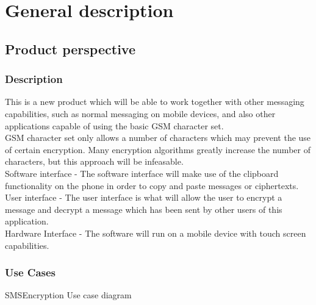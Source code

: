 \section{General description}

\subsection{Product perspective}

\subsubsection{Description}
This is a new product which will be able to work together with other messaging capabilities, such as normal messaging on mobile devices, and also other applications capable of using the basic GSM character set.
\vspace{12pt}\\
GSM character set only allows a number of characters which may prevent the use of certain encryption. Many encryption algorithms greatly increase the number of characters, but this approach will be infeasable.
\vspace{12pt}\\
Software interface - The software interface will make use of the clipboard functionality on the phone in order to copy and paste messages or ciphertexts.
\vspace{12pt}\\
User interface - The user interface is what will allow the user to encrypt a message and decrypt a message which has been sent by other users of this application.
\vspace{12pt}\\
Hardware Interface - The software will run on a mobile device with touch screen capabilities.


\newpage
\subsubsection{Use Cases}
SMSEncryption Use case diagram

